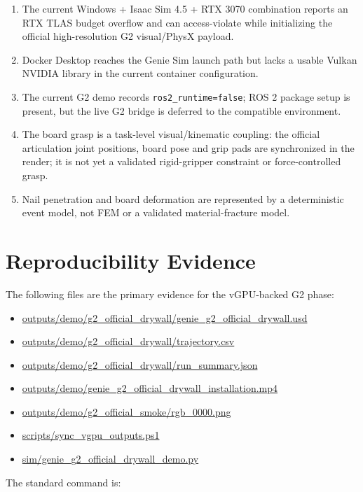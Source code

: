 \documentclass[11pt,a4paper]{article}
\begin{document}
\begin{enumerate}[leftmargin=2em]
  \item The current Windows + Isaac Sim 4.5 + RTX 3070 combination reports an RTX
        TLAS budget overflow and can access-violate while initializing the official
        high-resolution G2 visual/PhysX payload.
  \item Docker Desktop reaches the Genie Sim launch path but lacks a usable Vulkan
        NVIDIA library in the current container configuration.
  \item The current G2 demo records \texttt{ros2\_runtime=false}; ROS 2 package setup
        is present, but the live G2 bridge is deferred to the compatible environment.
  \item The board grasp is a task-level visual/kinematic coupling: the official
        articulation joint positions, board pose and grip pads are synchronized in the
        render; it is not yet a validated rigid-gripper constraint or force-controlled
        grasp.
  \item Nail penetration and board deformation are represented by a deterministic
        event model, not FEM or a validated material-fracture model.
\end{enumerate}

\section{Reproducibility Evidence}

The following files are the primary evidence for the vGPU-backed G2 phase:

\begin{itemize}[leftmargin=2em]
  \item \url{outputs/demo/g2_official_drywall/genie_g2_official_drywall.usd}
  \item \url{outputs/demo/g2_official_drywall/trajectory.csv}
  \item \url{outputs/demo/g2_official_drywall/run_summary.json}
  \item \url{outputs/demo/genie_g2_official_drywall_installation.mp4}
  \item \url{outputs/demo/g2_official_smoke/rgb_0000.png}
  \item \url{scripts/sync_vgpu_outputs.ps1}
  \item \url{sim/genie_g2_official_drywall_demo.py}
\end{itemize}

The standard command is:
\end{document}

